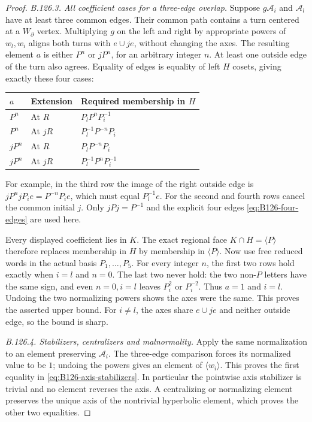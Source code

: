 \begin{proof}
\emph{B.126.3. All coefficient cases for a three-edge overlap.}
Suppose $g\mathcal A_i$ and $\mathcal A_l$ have at least three
common edges. Their common path contains a turn centered at a
$W_\partial$ vertex. Multiplying $g$ on the left and right by
appropriate powers of $w_l,w_i$ aligns both turns with
$e\cup je$, without changing the axes. The resulting element
$a$ is either $P^n$ or $jP^n$, for an arbitrary integer $n$.
At least one outside edge of the turn also agrees. Equality of
edges is equality of left $H$ cosets, giving exactly these four
cases:
\begin{center}
\begin{tabular}{lll}
\toprule
$a$ & Extension & Required membership in $H$\\
\midrule
$P^n$ & At $R$ & $P_lP^nP_i^{-1}$\\
$P^n$ & At $jR$ & $P_l^{-1}P^{-n}P_i$\\
$jP^n$ & At $R$ & $P_lP^{-n}P_i$\\
$jP^n$ & At $jR$ & $P_l^{-1}P^nP_i^{-1}$\\
\bottomrule
\end{tabular}
\end{center}
For example, in the third row the image of the right outside edge
is $jP^n jP_i e=P^{-n}P_i e$, which must equal $P_l^{-1}e$.
For the second and fourth rows cancel the common initial $j$.
Only $jPj=P^{-1}$ and the explicit four edges
\eqref{eq:B126-four-edges} are used here.

Every displayed coefficient lies in $K$. The exact regional face
$K\cap H=\langle P\rangle$ therefore replaces membership in
$H$ by membership in $\langle P\rangle$. Now use free reduced
words in the actual basis $P_1,\ldots,P_5$. For every integer
$n$, the first two rows hold exactly when $i=l$ and $n=0$.
The last two never hold: the two non-$P$ letters have the same
sign, and even $n=0,i=l$ leaves $P_i^2$ or $P_i^{-2}$.
Thus $a=1$ and $i=l$. Undoing the two normalizing powers shows
the axes were the same. This proves the asserted upper bound.
For $i\ne l$, the axes share $e\cup je$ and neither outside
edge, so the bound is sharp.

\emph{B.126.4. Stabilizers, centralizers and malnormality.}
Apply the same normalization to an element preserving
$\mathcal A_i$. The three-edge comparison forces its normalized
value to be $1$; undoing the powers gives an element of
$\langle w_i\rangle$. This proves the first equality in
\eqref{eq:B126-axis-stabilizers}. In particular the pointwise
axis stabilizer is trivial and no element reverses the axis.
A centralizing or normalizing element preserves the unique axis
of the nontrivial hyperbolic element, which proves the other two
equalities.


\end{proof}

